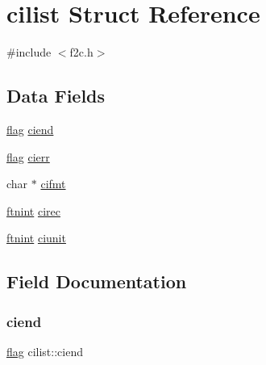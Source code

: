 \hypertarget{structcilist}{}\section{cilist Struct Reference}
\label{structcilist}


{\ttfamily \#include $<$f2c.\+h$>$}

\subsection*{Data Fields}
\begin{DoxyCompactItemize}
\item 
\hyperlink{dependencies_2third-party_2clapack_23_82_81_2_f2_c_l_i_b_s_2libf2c_2f2c_8h_abf5d144da384425ae6cb542ce6eec8d3}{flag} \hyperlink{structcilist_af16867fbc88cc3b26ecdedd0259fc5f5}{ciend}
\item 
\hyperlink{dependencies_2third-party_2clapack_23_82_81_2_f2_c_l_i_b_s_2libf2c_2f2c_8h_abf5d144da384425ae6cb542ce6eec8d3}{flag} \hyperlink{structcilist_aaa609be8bdf78a8fc7ba35b2ed0e6083}{cierr}
\item 
char $\ast$ \hyperlink{structcilist_afe080061de3f246df08a10b1e1cbdd46}{cifmt}
\item 
\hyperlink{dependencies_2third-party_2clapack_23_82_81_2_f2_c_l_i_b_s_2libf2c_2f2c_8h_a9d70cdb573fb2bf020e1f6dba85fb1cc}{ftnint} \hyperlink{structcilist_ace7c117f446a91e75e9f920fcff86546}{cirec}
\item 
\hyperlink{dependencies_2third-party_2clapack_23_82_81_2_f2_c_l_i_b_s_2libf2c_2f2c_8h_a9d70cdb573fb2bf020e1f6dba85fb1cc}{ftnint} \hyperlink{structcilist_a3e5d0438673d14f5889fb6a3e712a076}{ciunit}
\end{DoxyCompactItemize}


\subsection{Field Documentation}
\mbox{\label{structcilist_af16867fbc88cc3b26ecdedd0259fc5f5}} 
\subsubsection{\texorpdfstring{ciend}{ciend}}
{\footnotesize\ttfamily \hyperlink{dependencies_2third-party_2clapack_23_82_81_2_f2_c_l_i_b_s_2libf2c_2f2c_8h_abf5d144da384425ae6cb542ce6eec8d3}{flag} cilist\+::ciend}

